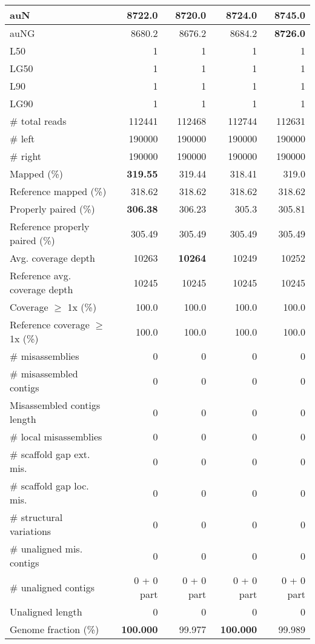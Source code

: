 \documentclass[12pt,a4paper]{article}
\begin{document}
\begin{table}[ht]
\begin{center}
\begin{tabular}{|l*{4}{|r}|}
auN & 8722.0 & 8720.0 & 8724.0 & {\bf 8745.0} \\ \hline
auNG & 8680.2 & 8676.2 & 8684.2 & {\bf 8726.0} \\ \hline
L50 & 1 & 1 & 1 & 1 \\ \hline
LG50 & 1 & 1 & 1 & 1 \\ \hline
L90 & 1 & 1 & 1 & 1 \\ \hline
LG90 & 1 & 1 & 1 & 1 \\ \hline
\# total reads & 112441 & 112468 & 112744 & 112631 \\ \hline
\# left & 190000 & 190000 & 190000 & 190000 \\ \hline
\# right & 190000 & 190000 & 190000 & 190000 \\ \hline
Mapped (\%) & {\bf 319.55} & 319.44 & 318.41 & 319.0 \\ \hline
Reference mapped (\%) & 318.62 & 318.62 & 318.62 & 318.62 \\ \hline
Properly paired (\%) & {\bf 306.38} & 306.23 & 305.3 & 305.81 \\ \hline
Reference properly paired (\%) & 305.49 & 305.49 & 305.49 & 305.49 \\ \hline
Avg. coverage depth & 10263 & {\bf 10264} & 10249 & 10252 \\ \hline
Reference avg. coverage depth & 10245 & 10245 & 10245 & 10245 \\ \hline
Coverage $\geq$ 1x (\%) & 100.0 & 100.0 & 100.0 & 100.0 \\ \hline
Reference coverage $\geq$ 1x (\%) & 100.0 & 100.0 & 100.0 & 100.0 \\ \hline
\# misassemblies & 0 & 0 & 0 & 0 \\ \hline
\# misassembled contigs & 0 & 0 & 0 & 0 \\ \hline
Misassembled contigs length & 0 & 0 & 0 & 0 \\ \hline
\# local misassemblies & 0 & 0 & 0 & 0 \\ \hline
\# scaffold gap ext. mis. & 0 & 0 & 0 & 0 \\ \hline
\# scaffold gap loc. mis. & 0 & 0 & 0 & 0 \\ \hline
\# structural variations & 0 & 0 & 0 & 0 \\ \hline
\# unaligned mis. contigs & 0 & 0 & 0 & 0 \\ \hline
\# unaligned contigs & 0 + 0 part & 0 + 0 part & 0 + 0 part & 0 + 0 part \\ \hline
Unaligned length & 0 & 0 & 0 & 0 \\ \hline
Genome fraction (\%) & {\bf 100.000} & 99.977 & {\bf 100.000} & 99.989 \\ \hline

\end{tabular}
\end{center}
\end{table}
\end{document}
